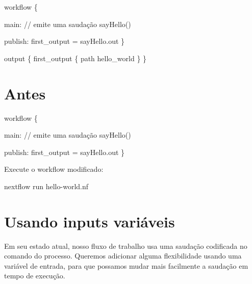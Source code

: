 \documentclass[
  brazilian,
  letterpaper,
  DIV=11,
  numbers=noendperiod]{scrreprt}
\newenvironment{Shaded}{\begin{snugshade}}{\end{snugshade}}
\newcommand{\CommentTok}[1]{\textcolor[rgb]{0.37,0.37,0.37}{#1}}
\newcommand{\ExtensionTok}[1]{\textcolor[rgb]{0.00,0.23,0.31}{#1}}
\newcommand{\FunctionTok}[1]{\textcolor[rgb]{0.28,0.35,0.67}{#1}}
\newcommand{\NormalTok}[1]{\textcolor[rgb]{0.00,0.23,0.31}{#1}}
\newcommand{\OperatorTok}[1]{\textcolor[rgb]{0.37,0.37,0.37}{#1}}
\newcommand{\StringTok}[1]{\textcolor[rgb]{0.13,0.47,0.30}{#1}}
\begin{document}
\begin{Shaded}
\begin{Highlighting}[]
\NormalTok{workflow }\OperatorTok{\{}

\NormalTok{    main}\OperatorTok{:}
    \CommentTok{// emite uma saudação}
    \FunctionTok{sayHello}\OperatorTok{()}

\NormalTok{    publish}\OperatorTok{:}
\NormalTok{    first\_output }\OperatorTok{=}\NormalTok{ sayHello}\OperatorTok{.}\NormalTok{out}
\OperatorTok{\}}

\NormalTok{output }\OperatorTok{\{}
\NormalTok{    first\_output }\OperatorTok{\{}
\NormalTok{        path }\StringTok{\textquotesingle{}hello\_world\textquotesingle{}}
    \OperatorTok{\}}
\OperatorTok{\}}
\end{Highlighting}
\end{Shaded}

\section{Antes}

\begin{Shaded}
\begin{Highlighting}[]
\NormalTok{workflow }\OperatorTok{\{}

\NormalTok{    main}\OperatorTok{:}
    \CommentTok{// emite uma saudação}
    \FunctionTok{sayHello}\OperatorTok{()}

\NormalTok{    publish}\OperatorTok{:}
\NormalTok{    first\_output }\OperatorTok{=}\NormalTok{ sayHello}\OperatorTok{.}\NormalTok{out}
\OperatorTok{\}}
\end{Highlighting}
\end{Shaded}

Execute o workflow modificado:

\begin{Shaded}
\begin{Highlighting}[]
\ExtensionTok{nextflow}\NormalTok{ run hello{-}world.nf}
\end{Highlighting}
\end{Shaded}

\section{Usando inputs variáveis}\label{usando-inputs-variuxe1veis}

Em seu estado atual, nosso fluxo de trabalho usa uma saudação codificada
no comando do processo. Queremos adicionar alguma flexibilidade usando
uma variável de entrada, para que possamos mudar mais facilmente a
saudação em tempo de execução.
\end{document}
